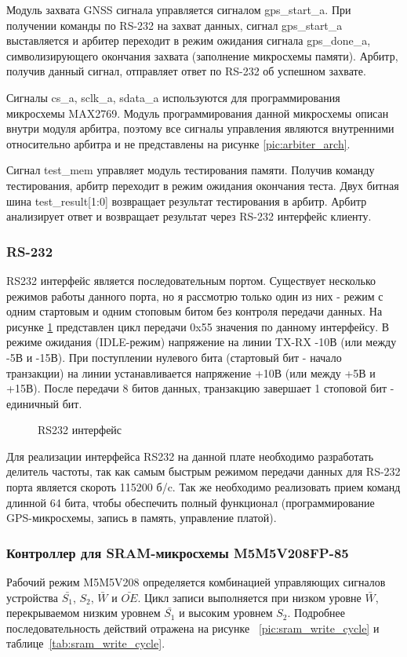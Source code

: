 Модуль захвата GNSS сигнала управляется сигналом gps\_start\_a.
При получении команды по RS-232 на захват данных, сигнал gps\_start\_a выставляется
и арбитер переходит в режим ожидания сигнала gps\_done\_a, символизирующего окончания захвата (заполнение микросхемы памяти).
Арбитр, получив данный сигнал, отправляет ответ по RS-232 об успешном захвате.

Сигналы cs\_a, sclk\_a, sdata\_a используются для программирования микросхемы MAX2769. Модуль программирования данной микросхемы
описан внутри модуля арбитра, поэтому все сигналы управления являются внутренними относительно арбитра и не представлены на рисунке
\ref{pic:arbiter_arch}. 

Сигнал test\_mem управляет модуль тестирования памяти. Получив команду тестирования, арбитр переходит в режим ожидания окончания теста.
Двух битная шина test\_result[1:0] возвращает результат тестирования в арбитр. Арбитр анализирует ответ и возвращает результат 
через RS-232 интерфейс клиенту.


\subsubsection*{RS-232}
\label{sec:rs232}
RS232 интерфейс является последовательным портом. Существует несколько режимов работы данного порта, но я рассмотрю только один
из них - режим с одним стартовым и одним стоповым битом без контроля передачи данных. На рисунке \ref{pic:rs232_wire} представлен
цикл передачи 0x55 значения по данному интерфейсу. В режиме ожидания (IDLE-режим) напряжение на линии TX-RX -10В (или между -5В и -15В).
При поступлении нулевого бита (стартовый бит - начало транзакции) на линии устанавливается напряжение +10В (или между +5В и +15В).
После передачи 8 битов данных, транзакцию завершает 1 стоповой бит - единичный бит.

\begin{figure}[H]
\caption{RS232 интерфейс}
\label{pic:rs232_wire}
\end{figure}

Для реализации интерфейса RS232 на данной плате необходимо разработать делитель частоты, так как самым быстрым режимом передачи данных
для RS-232 порта является скороть 115200 б/c. Так же необходимо реализовать прием команд длинной 64 бита, чтобы обеспечить
полный функционал (программирование GPS-микросхемы, запись в память, управление платой).

\subsubsection*{Контроллер для SRAM-микросхемы M5M5V208FP-85}
\label{sec:sram_controller}
Рабочий режим M5M5V208 определяется комбинацией управляющих сигналов устройства $\bar{S_1}$, ${S_2}$, $\bar{W}$ и $\bar{OE}$.
Цикл записи выполняется при низком уровне $\bar{W}$, перекрываемом низким уровнем $\bar{S_1}$ и высоким уровнем ${S_2}$.
Подробнее последовательность действий отражена на рисунке ~\ref{pic:sram_write_cycle} и таблице~\ref{tab:sram_write_cycle}.

